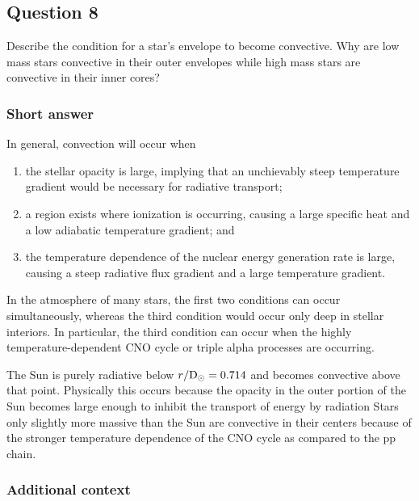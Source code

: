 \documentclass[a4paper,10pt]{article}
\begin{document}

\newpage
\subsection{Question 8}

Describe the condition for a star's envelope to become convective. Why are low mass stars convective in their outer envelopes while high mass stars are convective in their inner cores?

\subsubsection{Short answer}

{\noindent}In general, convection will occur when

\begin{enumerate}
    \item the stellar opacity is large, implying that an unchievably steep temperature gradient would be necessary for radiative transport;
    \item a region exists where ionization is occurring, causing a large specific heat and a low adiabatic temperature gradient; and
    \item the temperature dependence of the nuclear energy generation rate is large, causing a steep radiative flux gradient and a large temperature gradient.
\end{enumerate}

{\noindent}In the atmosphere of many stars, the first two conditions can occur simultaneously, whereas the third condition would occur only deep in stellar interiors. In particular, the third condition can occur when the highly temperature-dependent CNO cycle or triple alpha processes are occurring.

{\noindent}The Sun is purely radiative below $r/{\rm D_\odot}=0.714$ and becomes convective above that point. Physically this occurs because the opacity in the outer portion of the Sun becomes large enough to inhibit the transport of energy by radiation Stars only slightly more massive than the Sun are convective in their centers because of the stronger temperature dependence of the CNO cycle as compared to the pp chain.

\subsubsection{Additional context}
\end{document}
